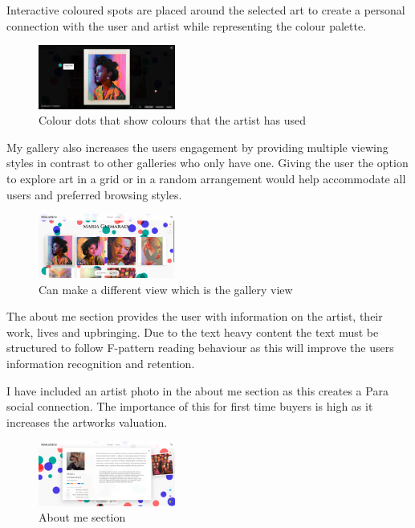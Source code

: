 \documentclass[]{project_final}
\begin{document}
Interactive coloured spots are placed around the selected art to create a personal connection with the user and artist while representing the colour palette.

\begin{figure}[ht!]
    \centering
    \includegraphics[width=0.4\textwidth]{AG32.png}
    \vspace*{0.0cm}
    \caption{Colour dots that show colours that the artist has used}
    \label{fig:1}
\end{figure}

My gallery also increases the users engagement by providing multiple viewing styles in contrast to other galleries who only have one. Giving the user the option to explore art in a grid or in a random arrangement would help accommodate all users and preferred browsing styles.

\begin{figure}[ht!]
    \centering
    \includegraphics[width=0.4\textwidth]{AG33.png}
    \vspace*{0.0cm}
    \caption{Can make a different view which is the gallery view}
    \label{fig:1}
\end{figure}

The about me section provides the user with information on the artist, their work, lives and upbringing. Due to the text heavy content the text must be structured to follow F-pattern reading behaviour as this will improve the users information recognition and retention.

I have included an artist photo in the about me section as this creates a Para social connection. The importance of this for first time buyers is high as it increases the artworks valuation.

\begin{figure}[ht!]
    \centering
    \includegraphics[width=0.4\textwidth]{AG34.png}
    \vspace*{0.0cm}
    \caption{About me section}
    \label{fig:1}
\end{figure}
\end{document}
